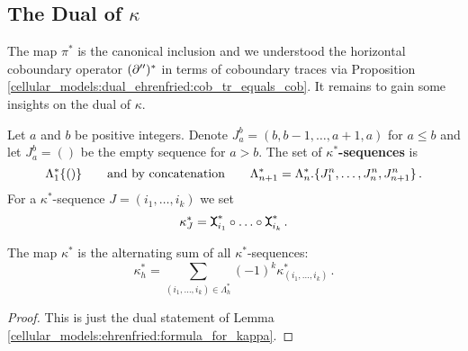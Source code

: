 \subsection{The Dual of \texorpdfstring{$\kappa$}{kappa}}
\label{cellular_models:dual_ehrenfried:kappa_dual}
The map $\pi^\ast$ is the canonical inclusion and we understood the horizontal coboundary operator $(\partial'')^\ast$ in terms of coboundary traces via Proposition \ref{cellular_models:dual_ehrenfried:cob_tr_equals_cob}.
It remains to gain some insights on the dual of $\kappa$.

\begin{defi}
    \label{cellular_models:dual_ehrenfried:kappa_dual_sequences}
    Let $a$ and $b$ be positive integers.
    Denote $J_a^b = (b,b-1, \ldots, a+1, a)$ for $a \le b$ and let $J_a^b = ()$ be the empty sequence for $a > b$.
    The set of {\bfseries $\kappa^\ast$-sequences} is
    \[
        \Lambda^\ast_1 \{ () \} \mspc{and by concatenation}{20} \Lambda^\ast_{n+1} = \Lambda^\ast_n.\{ J_1^n, \ldots, J_n^n, J_{n+1}^n \} \,.
    \]
    For a $\kappa^\ast$-sequence $J = (i_1, \ldots, i_k)$ we set
    \[
        \kappa^\ast_J = \mueta^\ast_{i_1} \circ \ldots \circ \mueta^\ast_{i_k} \,.
    \]
\end{defi}

\begin{lem}
    \label{cellular_models:dual_ehrenfried:formula_for_kappa_dual}
    The map $\kappa^\ast$ is the alternating sum of all $\kappa^\ast$-sequences:
    \[
        \kappa^\ast_h = \sum_{(i_1, \ldots, i_k) \in \Lambda^\ast_h} (-1)^k \kappa^\ast_{(i_1, \ldots, i_k)} \,.
    \]
\end{lem}

\begin{proof}
    This is just the dual statement of Lemma \ref{cellular_models:ehrenfried:formula_for_kappa}.
\end{proof}

